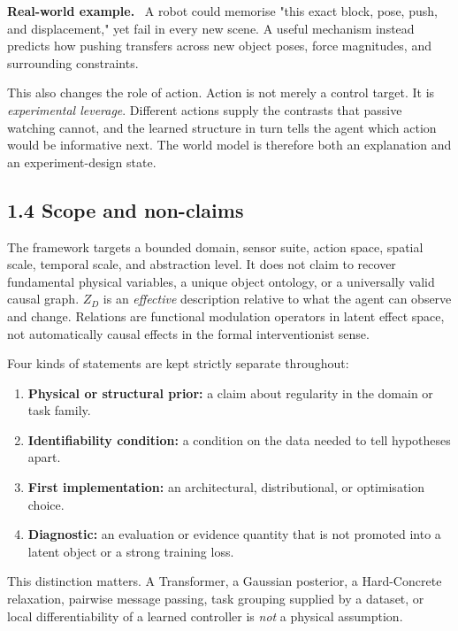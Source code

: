 \documentclass[11pt]{article}
\newenvironment{example}{%
  \par\smallskip\noindent\begin{minipage}{\textwidth}%
  \color{teal!60!black}\small
  \textbf{\color{teal!70!black}Real-world example.}\
}{%
  \end{minipage}\par\smallskip}
\begin{document}
\begin{example}
A robot could memorise "this exact block, pose, push, and displacement," yet fail in every new scene. A useful mechanism instead
predicts how pushing transfers across new object poses, force magnitudes, and surrounding constraints.
\end{example}

This also changes the role of action. Action is not merely a control target. It is \emph{experimental leverage}. Different actions
supply the contrasts that passive watching cannot, and the learned structure in turn tells the agent which action would be
informative next. The world model is therefore both an explanation and an experiment-design state.

\subsection*{1.4 Scope and non-claims}

The framework targets a bounded domain, sensor suite, action space, spatial scale, temporal scale, and abstraction level. It does
not claim to recover fundamental physical variables, a unique object ontology, or a universally valid causal graph. $Z_D$ is an
\emph{effective} description relative to what the agent can observe and change. Relations are functional modulation operators in
latent effect space, not automatically causal effects in the formal interventionist sense.

Four kinds of statements are kept strictly separate throughout:

\begin{enumerate}
\item \textbf{Physical or structural prior:} a claim about regularity in the domain or task family.
\item \textbf{Identifiability condition:} a condition on the data needed to tell hypotheses apart.
\item \textbf{First implementation:} an architectural, distributional, or optimisation choice.
\item \textbf{Diagnostic:} an evaluation or evidence quantity that is not promoted into a latent object or a strong training loss.
\end{enumerate}

This distinction matters. A Transformer, a Gaussian posterior, a Hard-Concrete relaxation, pairwise message passing, task
grouping supplied by a dataset, or local differentiability of a learned controller is \emph{not} a physical assumption.
\end{document}
